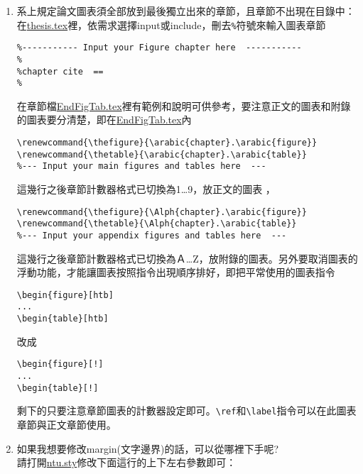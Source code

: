 \begin{acknowledgementsCH}
\begin{enumerate}[leftmargin=0pt, topsep=0pt, itemsep=0pt, label=\Roman{*}.]
\begin{enumerate}[topsep=0pt, itemsep=0pt, label=$\bullet$]
\begin{verbatim}
\chapter{First appendix title}
    \end{verbatim}
    即可，以此類推。    
        \item 系上規定論文圖表須全部放到最後獨立出來的章節，且章節不出現在目錄中：\\
    在\href{run:./thesis.tex}{thesis.tex}裡，依需求選擇input或include，刪去\texttt{\%}符號來輸入圖表章節
    \begin{verbatim}    
%----------- Input your Figure chapter here  -----------
% 
%chapter cite  == 
%
    \end{verbatim}
    在章節檔\href{run:./EndFigTab.tex}{EndFigTab.tex}裡有範例和說明可供參考，要注意正文的圖表和附錄的圖表要分清楚，即在\href{run:./EndFigTab.tex}{EndFigTab.tex}內
    \begin{verbatim}    
\renewcommand{\thefigure}{\arabic{chapter}.\arabic{figure}} 
\renewcommand{\thetable}{\arabic{chapter}.\arabic{table}} 
%--- Input your main figures and tables here  ---
    \end{verbatim}
    這幾行之後章節計數器格式已切換為1\dots 9，放正文的圖表 ，
     \begin{verbatim}    
\renewcommand{\thefigure}{\Alph{chapter}.\arabic{figure}} 
\renewcommand{\thetable}{\Alph{chapter}.\arabic{table}}
%--- Input your appendix figures and tables here  ---
    \end{verbatim}
    這幾行之後章節計數器格式已切換為Ａ\dots Z，放附錄的圖表。另外要取消圖表的浮動功能，才能讓圖表按照指令出現順序排好，即把平常使用的圖表指令
    \begin{verbatim}    
\begin{figure}[htb]
...
\begin{table}[htb]
    \end{verbatim}
    改成
     \begin{verbatim}    
\begin{figure}[!]
...
\begin{table}[!]
    \end{verbatim}
    剩下的只要注意章節圖表的計數器設定即可。\texttt{\textbackslash ref}和\texttt{\textbackslash label}指令可以在此圖表章節與正文章節使用。
     \item 如果我想要修改margin(文字邊界)的話，可以從哪裡下手呢?\\
     請打開\href{run:./ntu.sty}{ntu.sty}修改下面這行的上下左右參數即可：

\end{enumerate}
\end{enumerate}
\end{acknowledgementsCH}
